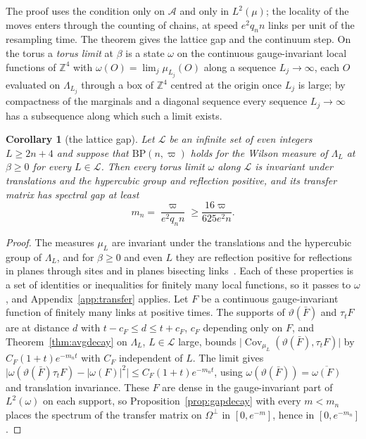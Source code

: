 \documentclass[aps,prd,twocolumn,superscriptaddress,nofootinbib,longbibliography,floatfix,amsmath,amssymb,10pt]{revtex4-2}
\newtheorem{corollary}[theorem]{Corollary}
\theoremstyle{definition}
\theoremstyle{remark}
\newcommand{\Z}{\mathbb{Z}}
\newcommand{\Cov}{\operatorname{Cov}}
\begin{document}
The proof uses the condition only on $\mathcal A$ and only in $L^2(\mu)$;
the locality of the moves enters through the counting of chains, at speed
$e^2q_nn$ links per unit of the resampling time. The theorem gives the
lattice gap and the continuum step. On the torus a \emph{torus limit} at
$\beta$ is a state $\omega$ on the continuous gauge-invariant local functions
of $\Z^4$ with $\omega(O)=\lim_j\mu_{L_j}(O)$ along a sequence $L_j\to\infty$,
each $O$ evaluated on $\Lambda_{L_j}$ through a box of $\Z^4$ centred at the
origin once $L_j$ is large; by compactness of the marginals and a diagonal
sequence every sequence $L_j\to\infty$ has a subsequence along which such a
limit exists.

\begin{corollary}[the lattice gap]\label{cor:avggap}
Let $\mathcal L$ be an infinite set of even integers $L\ge2n+4$ and suppose
that $\mathrm{BP}(n,\varpi)$ holds for the Wilson measure of $\Lambda_L$ at
$\beta\ge0$ for every $L\in\mathcal L$. Then every torus limit $\omega$ along
$\mathcal L$ is invariant under translations and the hypercubic group and
reflection positive, and its transfer matrix has spectral gap at least
\[
m_n=\frac{\varpi}{e^2q_nn}\ge\frac{16\varpi}{625e^2n}.
\]
\end{corollary}

\begin{proof}
The measures $\mu_L$ are invariant under the translations and the
hypercubic group of $\Lambda_L$, and for $\beta\ge0$ and even $L$ they are
reflection positive for reflections in planes through sites and in planes
bisecting links~\cite{OSei78,Sei82}. Each of these properties is a set of
identities or inequalities for finitely many local functions, so it passes to
$\omega$, and Appendix~\ref{app:transfer} applies. Let $F$ be a continuous
gauge-invariant function of finitely many links at positive times. The
supports of $\vartheta(\bar F)$ and $\tau_tF$ are at distance $d$ with
$t-c_F\le d\le t+c_F$, $c_F$ depending only on $F$, and
Theorem~\ref{thm:avgdecay} on $\Lambda_L$, $L\in\mathcal L$ large, bounds $\lvert\Cov_{\mu_L}(\vartheta(\bar
F),\tau_tF)\rvert$ by $C_F(1+t)e^{-m_nt}$ with $C_F$ independent of $L$. The
limit gives $\lvert\omega(\vartheta(\bar F)\tau_tF)-\lvert\omega(F)
\rvert^2\rvert\le C_F(1+t)e^{-m_nt}$, using $\omega(\vartheta(\bar F))=
\overline{\omega(F)}$ and translation invariance. These $F$ are dense in the
gauge-invariant part of $L^2(\omega)$ on each support, so
Proposition~\ref{prop:gapdecay} with every $m<m_n$ places the spectrum of the
transfer matrix on $\Omega^\perp$ in $[0,e^{-m}]$, hence in $[0,e^{-m_n}]$.
\end{proof}
\end{document}
